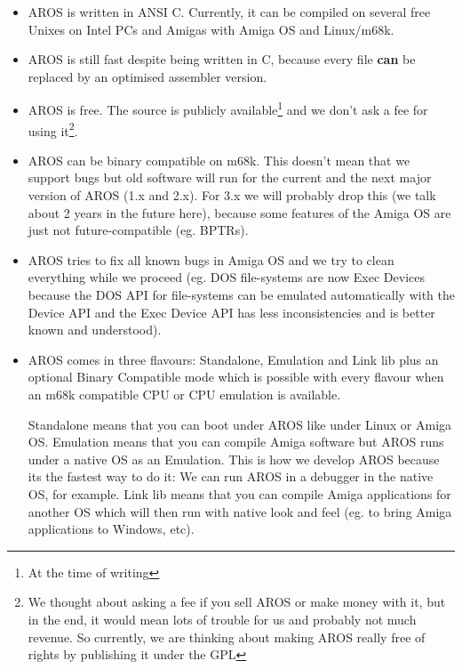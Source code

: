 \begin{itemize}
\item AROS is written in ANSI C. Currently, it can be compiled on several
free Unixes on Intel PCs and Amigas with Amiga OS and Linux/m68k.

\item AROS is still fast despite being written in C, because every file
{\bfseries can} be replaced by an optimised assembler version.

\item AROS is free. The source is publicly available\footnote{At the time of
writing} and we don't ask a fee for using it\footnote{We thought about
asking a fee if you sell AROS or make money with it, but in the end, it
would mean lots of trouble for us and probably not much revenue. So
currently, we are thinking about making AROS really free of rights by
publishing it under the GPL}.

\item AROS can be binary compatible on m68k. This doesn't mean that we
support bugs but old software will run for the current and the next major
version of AROS (1.x and 2.x). For 3.x we will probably drop this (we talk
about 2 years in the future here), because some features of the Amiga OS are
just not future-compatible (eg. BPTRs).

\item AROS tries to fix all known bugs in Amiga OS and we try to clean
everything while we proceed (eg. DOS file-systems are now Exec Devices
because the DOS API for file-systems can be emulated automatically with the
Device API and the Exec Device API has less inconsistencies and is better
known and understood).

\item AROS comes in three flavours: Standalone, Emulation and Link lib plus
an optional Binary Compatible mode which is possible with every flavour
when an m68k compatible CPU or CPU emulation is available.

Standalone means that you can boot under AROS like under Linux or Amiga OS.
Emulation means that you can compile Amiga software but AROS runs under a
native OS as an Emulation. This is how we develop AROS because its the
fastest way to do it: We can run AROS in a debugger in the native OS, for
example. Link lib means that you can compile Amiga applications for another
OS which will then run with native look and feel (eg. to bring Amiga applications to
Windows, etc).

\end{itemize}

